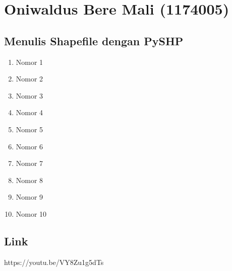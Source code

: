 \section{Oniwaldus Bere Mali (1174005)}
\subsection{Menulis Shapefile dengan PySHP}
\begin{enumerate}
	\item Nomor 1
	
	\item Nomor 2
	

	
	\item Nomor 3
	

	
	\item Nomor 4
	
	
		
	\item Nomor 5
	
	
		
	\item Nomor 6
	

		
	\item Nomor 7
	

		
	\item Nomor 8
	

		
	\item Nomor 9
	

		
	\item Nomor 10
	
		
\end{enumerate}
\subsection{Link}
https://youtu.be/VY8Zu1g5dTs